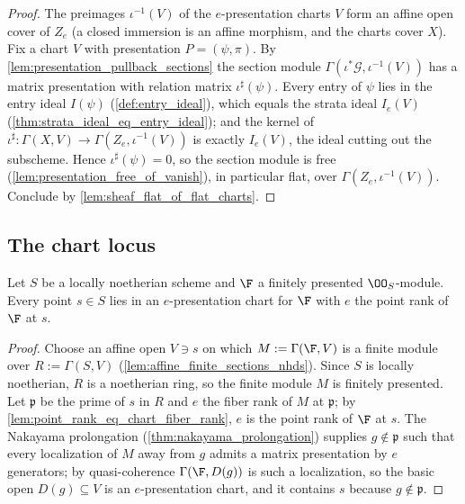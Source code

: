 \begin{proof}
  \leanok
  The preimages \(\iota^{-1}(V)\) of the \(e\)-presentation charts \(V\)
  form an affine open cover of \(Z_e\) (a closed immersion is an affine
  morphism, and the charts cover \(X\)).  Fix a chart \(V\) with
  presentation \(P = (\psi, \pi)\).  By
  \cref{lem:presentation_pullback_sections} the section module
  \(\Gamma(\iota^*\mathcal G, \iota^{-1}(V))\) has a matrix presentation
  with relation matrix \(\iota^\sharp(\psi)\).  Every entry of \(\psi\) lies
  in the entry ideal \(I(\psi)\) (\cref{def:entry_ideal}), which equals the
  strata ideal \(I_e(V)\) (\cref{thm:strata_ideal_eq_entry_ideal}); and the
  kernel of \(\iota^\sharp : \Gamma(X, V) \to \Gamma(Z_e, \iota^{-1}(V))\)
  is exactly \(I_e(V)\), the ideal cutting out the subscheme.  Hence
  \(\iota^\sharp(\psi) = 0\), so the section module is free
  (\cref{lem:presentation_free_of_vanish}), in particular flat, over
  \(\Gamma(Z_e, \iota^{-1}(V))\).  Conclude by
  \cref{lem:sheaf_flat_of_flat_charts}.
\end{proof}

\subsection{The chart locus}

\begin{theorem}
  \label{thm:presentation_chart_exists}
  \leanok
  Let \(S\) be a locally noetherian scheme and \(\F\) a finitely presented
  \(\OO_S\)-module.  Every point \(s \in S\) lies in an \(e\)-presentation
  chart for \(\F\) with \(e\) the point rank of \(\F\) at \(s\).
\end{theorem}

\begin{proof}
  \leanok
  Choose an affine open \(V \ni s\) on which \(M := \Gamma(\F, V)\) is a
  finite module over \(R := \Gamma(S, V)\)
  (\cref{lem:affine_finite_sections_nhds}).  Since \(S\) is locally
  noetherian, \(R\) is a noetherian ring, so the finite module \(M\) is
  finitely presented.  Let \(\mathfrak p\) be the prime of \(s\) in \(R\)
  and \(e\) the fiber rank of \(M\) at \(\mathfrak p\); by
  \cref{lem:point_rank_eq_chart_fiber_rank}, \(e\) is the point rank of
  \(\F\) at \(s\).  The Nakayama prolongation
  (\cref{thm:nakayama_prolongation}) supplies \(g \notin \mathfrak p\) such
  that every localization of \(M\) away from \(g\) admits a matrix
  presentation by \(e\) generators; by quasi-coherence
  \(\Gamma(\F, D(g))\) is such a localization, so the basic open
  \(D(g) \subseteq V\) is an \(e\)-presentation chart, and it contains
  \(s\) because \(g \notin \mathfrak p\).
\end{proof}

